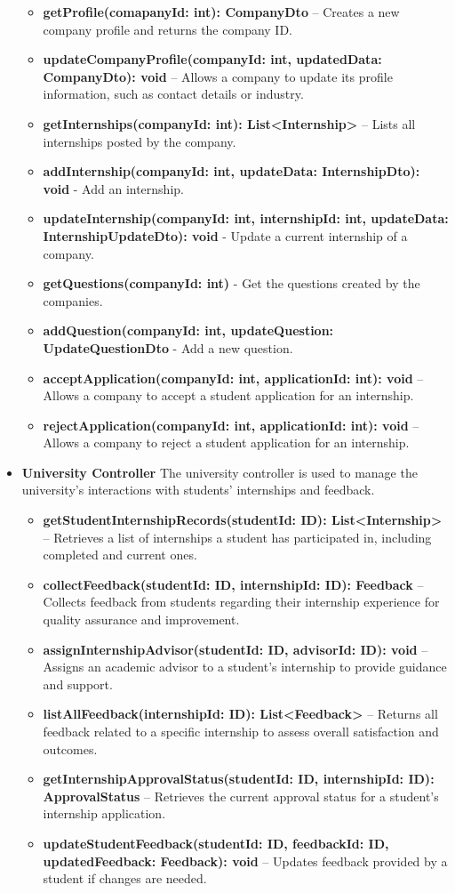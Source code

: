 \begin{itemize}
\begin{itemize}
    \item \textbf{getProfile(comapanyId: int): CompanyDto} – Creates a new company profile and returns the company ID.
    \item \textbf{updateCompanyProfile(companyId: int, updatedData: CompanyDto): void} – Allows a company to update its profile information, such as contact details or industry.
    \item \textbf{getInternships(companyId: int): List<Internship>} – Lists all internships posted by the company.
    \item \textbf{addInternship(companyId: int, updateData: InternshipDto): void} - Add an internship.
    \item \textbf{updateInternship(companyId: int, internshipId: int, updateData: InternshipUpdateDto): void} - Update a current internship of a company.
    \item \textbf{getQuestions(companyId: int)} - Get the questions created by the companies.
    \item \textbf{addQuestion(companyId: int, updateQuestion: UpdateQuestionDto} - Add a new question.
    \item \textbf{acceptApplication(companyId: int, applicationId: int): void} – Allows a company to accept a student application for an internship.
    \item \textbf{rejectApplication(companyId: int, applicationId: int): void} – Allows a company to reject a student application for an internship.
\end{itemize}

\item \textbf{University Controller}
The university controller is used to manage the university's interactions with students' internships and feedback.
\begin{itemize}
    \item \textbf{getStudentInternshipRecords(studentId: ID): List<Internship>} – Retrieves a list of internships a student has participated in, including completed and current ones.
    \item \textbf{collectFeedback(studentId: ID, internshipId: ID): Feedback} – Collects feedback from students regarding their internship experience for quality assurance and improvement.
    \item \textbf{assignInternshipAdvisor(studentId: ID, advisorId: ID): void} – Assigns an academic advisor to a student's internship to provide guidance and support.
    \item \textbf{listAllFeedback(internshipId: ID): List<Feedback>} – Returns all feedback related to a specific internship to assess overall satisfaction and outcomes.
    \item \textbf{getInternshipApprovalStatus(studentId: ID, internshipId: ID): ApprovalStatus} – Retrieves the current approval status for a student's internship application.
    \item \textbf{updateStudentFeedback(studentId: ID, feedbackId: ID, updatedFeedback: Feedback): void} – Updates feedback provided by a student if changes are needed.
\end{itemize}




\end{itemize}
